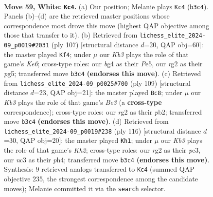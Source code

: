 \documentclass[11pt]{article}
\begin{document}
\clearpage

\begin{figure}[p]\centering
\begin{subfigure}{0.46\textwidth}\centering
\resizebox{\linewidth}{!}{%
\newchessgame
\chessboard[
  setfen={8/7p/5k2/4p3/rp4b1/1Kn5/6r1/8 w - - 8 59},
  showmover=false,
  pgfstyle=straightmove, color=movearrow, markmove={b3-c4}
]}
\caption{}
\end{subfigure}\hfill
\begin{subfigure}{0.46\textwidth}\centering
\resizebox{\linewidth}{!}{%
\newchessgame
\chessboard[
  setfen={8/8/8/4p1P1/1K2N3/4kP2/5R2/6r1 b - - 6 54},
  showmover=false,
  pgfstyle=straightmove, color=movearrow, markmove={e3-f4}
]}
\caption{}
\end{subfigure}
\\[4pt]
\begin{subfigure}{0.46\textwidth}\centering
\resizebox{\linewidth}{!}{%
\newchessgame
\chessboard[
  setfen={8/8/4b3/2k5/1R4N1/P7/1PPK4/8 b - - 2 55},
  showmover=false,
  pgfstyle=straightmove, color=movearrow, markmove={e6-c8}
]}
\caption{}
\end{subfigure}\hfill
\begin{subfigure}{0.46\textwidth}\centering
\resizebox{\linewidth}{!}{%
\newchessgame
\chessboard[
  setfen={4R3/6k1/8/6b1/7p/4ppr1/7K/8 w - - 0 59},
  showmover=false,
  pgfstyle=straightmove, color=movearrow, markmove={h2-h1}
]}
\caption{}
\end{subfigure}
\caption{\textbf{Move 59, White: \texttt{Kc4}.} (a) Our position; Melanie plays \texttt{Kc4} (\texttt{b3c4}). Panels (b)--(d) are the retrieved master positions whose correspondence most drove this move (highest QAP objective among those that transfer to it). (b) Retrieved from \texttt{lichess\_elite\_2024-09\_p0019\#2031} (ply 107) [structural distance $d$=20, QAP obj=60]: the master played \texttt{Kf4}; under $\mu$ our \emph{Kb3} plays the role of that game's \emph{Ke6}; cross-type roles: our \emph{b}g4 as their \emph{P}e5, our \emph{r}g2 as their \emph{p}g5; transferred move \texttt{b3c4} \textbf{(endorses this move)}. (c) Retrieved from \texttt{lichess\_elite\_2024-09\_p0025\#700} (ply 109) [structural distance $d$=23, QAP obj=21]: the master played \texttt{Bc8}; under $\mu$ our \emph{Kb3} plays the role of that game's \emph{Be3} (a \textbf{cross-type} correspondence); cross-type roles: our \emph{r}g2 as their \emph{p}b2; transferred move \texttt{b3c4} \textbf{(endorses this move)}. (d) Retrieved from \texttt{lichess\_elite\_2024-09\_p0019\#238} (ply 116) [structural distance $d$=30, QAP obj=20]: the master played \texttt{Kh1}; under $\mu$ our \emph{Kb3} plays the role of that game's \emph{Kh2}; cross-type roles: our \emph{r}g2 as their \emph{p}e3, our \emph{n}c3 as their \emph{p}h4; transferred move \texttt{b3c4} \textbf{(endorses this move)}. Synthesis: 9 retrieved analogs transferred to \texttt{Kc4} (summed QAP objective 235, the strongest correspondence among the candidate moves); Melanie committed it via the \texttt{search} selector.}
\label{fig:thought-m116}
\end{figure}
\end{document}
